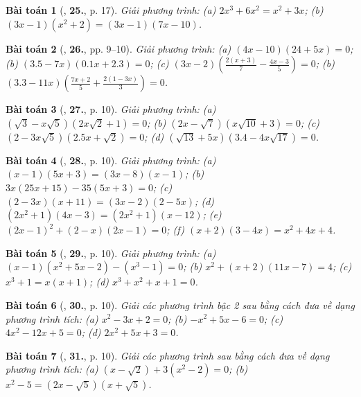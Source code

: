 \documentclass{article}
\numberwithin{equation}{section}
\newtheorem{baitoan}{Bài toán}
\begin{document}
\begin{baitoan}[\cite{SGK_Toan_8_tap_2}, \textbf{25.}, p. 17]
	Giải phương trình: (a) $2x^3 + 6x^2 = x^2 + 3x$; (b) $(3x - 1)(x^2 + 2) = (3x - 1)(7x - 10)$.
\end{baitoan}

\begin{baitoan}[\cite{SBT_Toan_8_tap_2}, \textbf{26.}, pp. 9--10]
	Giải phương trình: (a) $(4x - 10)(24 + 5x) = 0$; (b) $(3.5 - 7x)(0.1x + 2.3) = 0$; (c) $(3x - 2)\left(\frac{2(x + 3)}{7} - \frac{4x - 3}{5}\right) = 0$; (b) $(3.3 - 11x)\left(\frac{7x + 2}{5} + \frac{2(1 - 3x)}{3}\right) = 0$.
\end{baitoan}

\begin{baitoan}[\cite{SBT_Toan_8_tap_2}, \textbf{27.}, p. 10]
	Giải phương trình: (a) $(\sqrt{3} - x\sqrt{5})(2x\sqrt{2} + 1) = 0$; (b) $(2x - \sqrt{7})(x\sqrt{10} + 3) = 0$; (c) $(2 - 3x\sqrt{5})(2.5x + \sqrt{2}) = 0$; (d) $(\sqrt{13} + 5x)(3.4 - 4x\sqrt{17}) = 0$.
\end{baitoan}

\begin{baitoan}[\cite{SBT_Toan_8_tap_2}, \textbf{28.}, p. 10]
	Giải phương trình: (a) $(x - 1)(5x + 3) = (3x - 8)(x - 1)$; (b) $3x(25x + 15) - 35(5x + 3) = 0$; (c) $(2 - 3x)(x + 11) = (3x - 2)(2 - 5x)$; (d) $(2x^2 + 1)(4x - 3) = (2x^2 + 1)(x - 12)$; (e) $(2x - 1)^2 + (2 - x)(2x - 1) = 0$; (f) $(x + 2)(3 - 4x) = x^2 + 4x + 4$.
\end{baitoan}

\begin{baitoan}[\cite{SBT_Toan_8_tap_2}, \textbf{29.}, p. 10]
	Giải phương trình: (a) $(x - 1)(x^2 + 5x - 2) - (x^3 - 1) = 0$; (b) $x^2 + (x + 2)(11x - 7) = 4$; (c) $x^3 + 1 = x(x + 1)$; (d) $x^3 + x^2 + x + 1 = 0$.
\end{baitoan}

\begin{baitoan}[\cite{SBT_Toan_8_tap_2}, \textbf{30.}, p. 10]
	Giải các phương trình bậc 2 sau bằng cách đưa về dạng phương trình tích: (a) $x^2 - 3x + 2 = 0$; (b) $-x^2 + 5x - 6 = 0$; (c) $4x^2 - 12x + 5 = 0$; (d) $2x^2 + 5x + 3 = 0$.
\end{baitoan}

\begin{baitoan}[\cite{SBT_Toan_8_tap_2}, \textbf{31.}, p. 10]
	Giải các phương trình sau bằng cách đưa về dạng phương trình tích: (a) $(x - \sqrt{2}) + 3(x^2 - 2) = 0$; (b) $x^2 - 5 = (2x - \sqrt{5})(x + \sqrt{5})$.
\end{baitoan}
\end{document}
